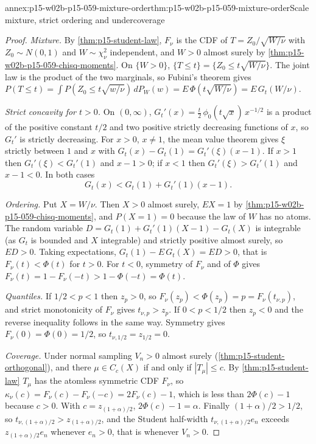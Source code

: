 \begin{annexitem}{annex:p15-w02b-p15-059-mixture-order}{thm:p15-w02b-p15-059-mixture-order}{Scale mixture, strict ordering and undercoverage}
\begin{proof}
\emph{Mixture.} By \cref{thm:p15-student-law}, \(F_\nu\) is the CDF of
\(T=Z_0/\sqrt{W/\nu}\) with \(Z_0\sim N(0,1)\) and \(W\sim\chi^2_\nu\)
independent, and \(W>0\) almost surely by
\cref{thm:p15-w02b-p15-059-chisq-moments}. On \(\{W>0\}\),
\(\{T\leq t\}=\{Z_0\leq t\sqrt{W/\nu}\}\). The joint law is the product of
the two marginals, so Fubini's theorem gives
\(P(T\leq t)=\int P(Z_0\leq t\sqrt{w/\nu})\,dP_W(w)
=E\,\Phi(t\sqrt{W/\nu})=E\,G_t(W/\nu)\).

\emph{Strict concavity for \(t>0\).} On \((0,\infty)\),
\(G_t'(x)=\tfrac t2\,\phi_0(t\sqrt x)\,x^{-1/2}\) is a product of the
positive constant \(t/2\) and two positive strictly decreasing functions of
\(x\), so \(G_t'\) is strictly decreasing. For \(x>0\), \(x\neq1\), the mean
value theorem gives \(\xi\) strictly between \(1\) and \(x\) with
\(G_t(x)-G_t(1)=G_t'(\xi)(x-1)\). If \(x>1\) then \(G_t'(\xi)<G_t'(1)\) and
\(x-1>0\); if \(x<1\) then \(G_t'(\xi)>G_t'(1)\) and \(x-1<0\). In both
cases
\[
 G_t(x)<G_t(1)+G_t'(1)(x-1).
\]

\emph{Ordering.} Put \(X=W/\nu\). Then \(X>0\) almost surely, \(EX=1\)
by \cref{thm:p15-w02b-p15-059-chisq-moments}, and \(P(X=1)=0\) because the
law of \(W\) has no atoms. The random variable
\(D=G_t(1)+G_t'(1)(X-1)-G_t(X)\) is integrable (as \(G_t\) is bounded and
\(X\) integrable) and strictly positive almost surely, so \(ED>0\). Taking
expectations, \(G_t(1)-E\,G_t(X)=ED>0\), that is \(F_\nu(t)<\Phi(t)\) for
\(t>0\). For \(t<0\), symmetry of \(F_\nu\) and of \(\Phi\) gives
\(F_\nu(t)=1-F_\nu(-t)>1-\Phi(-t)=\Phi(t)\).

\emph{Quantiles.} If \(1/2<p<1\) then \(z_p>0\), so
\(F_\nu(z_p)<\Phi(z_p)=p=F_\nu(t_{\nu,p})\), and strict monotonicity of
\(F_\nu\) gives \(t_{\nu,p}>z_p\). If \(0<p<1/2\) then \(z_p<0\) and the
reverse inequality follows in the same way. Symmetry gives
\(F_\nu(0)=\Phi(0)=1/2\), so \(t_{\nu,1/2}=z_{1/2}=0\).

\emph{Coverage.} Under normal sampling \(V_n>0\) almost surely
(\cref{thm:p15-student-orthogonal}), and there
\(\mu\in C_c(X)\) if and only if \(|T_\mu|\leq c\). By
\cref{thm:p15-student-law} \(T_\mu\) has the atomless symmetric CDF
\(F_\nu\), so \(\kappa_\nu(c)=F_\nu(c)-F_\nu(-c)=2F_\nu(c)-1\), which is
less than \(2\Phi(c)-1\) because \(c>0\). With \(c=z_{(1+\alpha)/2}\),
\(2\Phi(c)-1=\alpha\). Finally \((1+\alpha)/2>1/2\), so
\(t_{\nu,(1+\alpha)/2}>z_{(1+\alpha)/2}\), and the Student half-width
\(t_{\nu,(1+\alpha)/2}e_n\) exceeds \(z_{(1+\alpha)/2}e_n\) whenever
\(e_n>0\), that is whenever \(V_n>0\).
\end{proof}
\end{annexitem}

